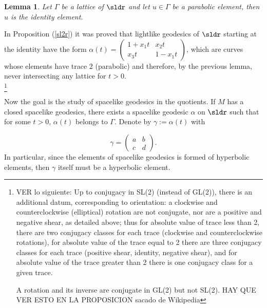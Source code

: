 \documentclass[11pt]{amsart}
\theoremstyle{plain}
\newtheorem{lem}[thm]{Lemma}
\theoremstyle{definition}
\theoremstyle{remark}
\begin{document}


\begin{lem}\cite{DM}\label{lemaunipotentes}
Let $\Gamma$ be a lattice of $\sldr$ and let $u \in \Gamma$ be a parabolic element, then $u$ is the identity element. 
\end{lem}

In Proposition (\ref{sl2r}) it was proved that lightlike geodesics of $\sldr$ starting at the identity have the form $\alpha(t)=
\left(\begin{array}{cc}
1+x_1 t & x_2t \\
x_3t & 1-x_1t \end{array} \right)$,
which are curves whose elements have trace $2$ (parabolic) and therefore, by the previous lemma, never intersecting any lattice for $t>0$.\\





 \footnote{ VER lo siguiente: Up to conjugacy in SL(2) (instead of GL(2)), there is an additional datum, corresponding to orientation: a clockwise and counterclockwise (elliptical) rotation are not conjugate, nor are a positive and negative shear, as detailed above; thus for absolute value of trace less than 2, there are two conjugacy classes for each trace (clockwise and counterclockwise rotations), for absolute value of the trace equal to 2 there are three conjugacy classes for each trace (positive shear, identity, negative shear), and for absolute value of the trace greater than 2 there is one conjugacy class for a given trace.  

 A rotation and its inverse are conjugate in GL(2) but not SL(2). HAY QUE VER ESTO EN LA PROPOSICION sacado de Wikipedia}

Now the goal is the study of spacelike geodesics in the quotients. If $M$ has a closed spacelike geodesics,  there exists a spacelike geodesic $\alpha$ on $\sldr$ such that for some $t>0$, $\alpha(t)$ belongs to $\Gamma$. Denote by $\gamma:=\alpha(t)$ with 

\begin{equation} \label{gamma}
\gamma = \left(\begin{matrix}
a & b \\
c & d \end{matrix}\right).
\end{equation}
In particular, since the elements of spacelike geodesics is formed of hyperbolic elements, then $\gamma$ itself must be a hyperbolic element. \\
\end{document}
